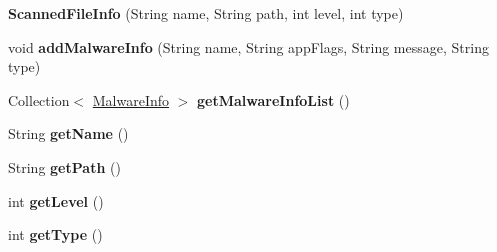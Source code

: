 \begin{DoxyCompactItemize}
\item 
\hypertarget{classcom_1_1avira_1_1antivirusimplementation_1_1_scanned_file_info_a9d44d7c6e00bb629fbfb9924c39cff21}{}{\bfseries Scanned\+File\+Info} (String name, String path, int level, int type)\label{classcom_1_1avira_1_1antivirusimplementation_1_1_scanned_file_info_a9d44d7c6e00bb629fbfb9924c39cff21}

\item 
\hypertarget{classcom_1_1avira_1_1antivirusimplementation_1_1_scanned_file_info_a9a773d1a4d9454b10f8735cce566aa77}{}void {\bfseries add\+Malware\+Info} (String name, String app\+Flags, String message, String type)\label{classcom_1_1avira_1_1antivirusimplementation_1_1_scanned_file_info_a9a773d1a4d9454b10f8735cce566aa77}

\item 
\hypertarget{classcom_1_1avira_1_1antivirusimplementation_1_1_scanned_file_info_a60687dd60065b566c51ccc6e670038ba}{}Collection$<$ \hyperlink{classcom_1_1avira_1_1antivirusimplementation_1_1_malware_info}{Malware\+Info} $>$ {\bfseries get\+Malware\+Info\+List} ()\label{classcom_1_1avira_1_1antivirusimplementation_1_1_scanned_file_info_a60687dd60065b566c51ccc6e670038ba}

\item 
\hypertarget{classcom_1_1avira_1_1antivirusimplementation_1_1_scanned_file_info_a5f806652d11249e3895534dea465aeb3}{}String {\bfseries get\+Name} ()\label{classcom_1_1avira_1_1antivirusimplementation_1_1_scanned_file_info_a5f806652d11249e3895534dea465aeb3}

\item 
\hypertarget{classcom_1_1avira_1_1antivirusimplementation_1_1_scanned_file_info_a1bf9da2289d22ad665c5dc0bc6d0fdba}{}String {\bfseries get\+Path} ()\label{classcom_1_1avira_1_1antivirusimplementation_1_1_scanned_file_info_a1bf9da2289d22ad665c5dc0bc6d0fdba}

\item 
\hypertarget{classcom_1_1avira_1_1antivirusimplementation_1_1_scanned_file_info_a399d5e5b1fc6c26a856fa57d389348c6}{}int {\bfseries get\+Level} ()\label{classcom_1_1avira_1_1antivirusimplementation_1_1_scanned_file_info_a399d5e5b1fc6c26a856fa57d389348c6}

\item 
\hypertarget{classcom_1_1avira_1_1antivirusimplementation_1_1_scanned_file_info_aade2ec4574cb79075fa5efb0f4332f4d}{}int {\bfseries get\+Type} ()\label{classcom_1_1avira_1_1antivirusimplementation_1_1_scanned_file_info_aade2ec4574cb79075fa5efb0f4332f4d}


\end{DoxyCompactItemize}
